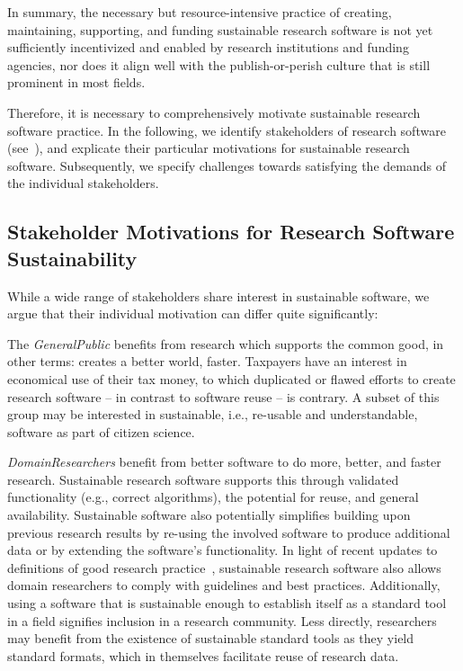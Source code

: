 \documentclass[a4paper,num-refs,numbers,sort&compress]{de-rse}
\begin{document}
In summary, the necessary but resource-intensive practice of creating, maintaining, supporting, and funding sustainable
research software is not yet sufficiently incentivized and enabled by
research institutions and funding agencies, nor does it align well with
the publish-or-perish culture that is still prominent in most fields.

Therefore, it is necessary to comprehensively motivate sustainable research software
practice.
In the following, we identify stakeholders of research software (see~\cite{Katz2019,Druskat2018,ye2019open}), and explicate their particular motivations for sustainable research software. Subsequently, we
specify challenges towards satisfying the demands of the individual stakeholders.

\subsection{Stakeholder Motivations for Research Software Sustainability}

While a wide range of stakeholders share interest in sustainable software, we argue that their individual motivation can differ quite significantly:

The \textit{\gls{GeneralPublic}} benefits from research which supports the
common good, in other terms: creates a better world, faster. Taxpayers
have an interest in economical use of their tax money, to which
duplicated or flawed efforts to create research software -- in contrast to software reuse -- is contrary. A subset of this group may be interested in sustainable, i.e., re-usable and understandable, software as part of citizen
science.


\textit{\Gls{DomainResearchers}} benefit from better software to do more, better, and faster research. Sustainable research software supports this through validated functionality (e.g., correct algorithms), the potential for reuse, and general availability. Sustainable software also potentially simplifies building upon previous research results by re-using the involved software to produce additional data or by extending the software's functionality.
In light of recent updates to definitions of good research practice~\cite{DFGcode}, sustainable research software also allows domain researchers to comply with guidelines and best practices. Additionally, using a software that is sustainable enough to
establish itself as a standard tool in a field signifies inclusion in a research
community. Less directly, researchers may benefit from the existence of sustainable standard tools as they yield standard formats, which in
themselves facilitate reuse of research data.
\end{document}
